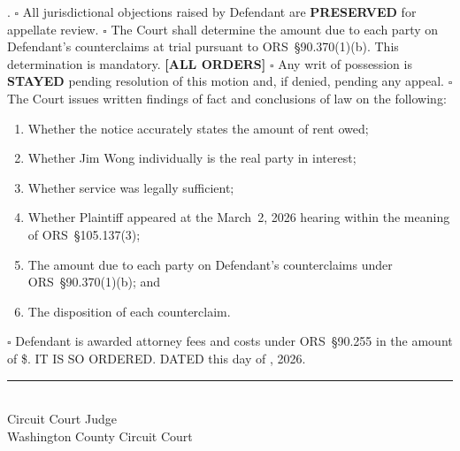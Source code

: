\documentclass[10pt,letterpaper,oneside]{extarticle}
\begin{document}
\underline{\hspace{1.5in}}.
\vspace{0.3em}
\noindent $\square$ All jurisdictional objections raised
by Defendant are \textbf{PRESERVED} for appellate review.
\vspace{0.3em}
\noindent $\square$ The Court shall determine the amount
due to each party on Defendant's counterclaims at trial
pursuant to ORS~\S90.370(1)(b). This determination is
mandatory.
\vspace{0.5em}
\noindent \textbf{[ALL ORDERS]}
\vspace{0.3em}
\noindent $\square$ Any writ of possession is
\textbf{STAYED} pending resolution of this motion and,
if denied, pending any appeal.
\vspace{0.3em}
\noindent $\square$ The Court issues written findings of
fact and conclusions of law on the following:
\begin{enumerate}[label=(\alph*),leftmargin=.5in,
itemsep=2pt]
\item Whether the notice accurately states the
amount of rent owed;
\item Whether Jim Wong individually is the real
party in interest;
\item Whether service was legally sufficient;
\item Whether Plaintiff appeared at the March~2,
2026 hearing within the meaning of
ORS~\S105.137(3);
\item The amount due to each party on Defendant's
counterclaims under ORS~\S90.370(1)(b); and
\item The disposition of each counterclaim.
\end{enumerate}
\vspace{0.3em}
\noindent $\square$ Defendant is awarded attorney fees
and costs under ORS~\S90.255 in the amount of
\$\underline{\hspace{1in}}.
\vspace{1.5em}
\noindent IT IS SO ORDERED.
\vspace{1.5em}
\noindent DATED this \underline{\hspace{0.5in}} day of
\underline{\hspace{1.2in}}, 2026.
\vspace{2em}
\noindent\rule{3.5in}{0.5pt}\\
Circuit Court Judge\\
Washington County Circuit Court
\end{document}
